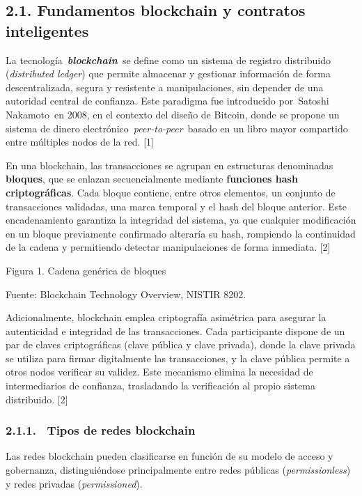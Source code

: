 \subsection{2.1. Fundamentos blockchain y contratos
inteligentes}\label{fundamentos-blockchain-y-contratos-inteligentes}

La tecnología~\textbf{\emph{blockchain}}~se define como un sistema de
registro distribuido (\emph{distributed ledger}) que permite almacenar y
gestionar información de forma descentralizada, segura y resistente a
manipulaciones, sin depender de una autoridad central de confianza. Este
paradigma fue introducido por~Satoshi Nakamoto~en 2008, en el contexto
del diseño de Bitcoin, donde se propone un sistema de dinero
electrónico~\emph{peer-to-peer}~basado en un libro mayor compartido
entre múltiples nodos de la red. {[}1{]}

En una blockchain, las transacciones se agrupan en estructuras
denominadas \textbf{bloques}, que se enlazan secuencialmente mediante
\textbf{funciones hash criptográficas}. Cada bloque contiene, entre
otros elementos, un conjunto de transacciones validadas, una marca
temporal y el hash del bloque anterior. Este encadenamiento garantiza la
integridad del sistema, ya que cualquier modificación en un bloque
previamente confirmado alteraría su hash, rompiendo la continuidad de la
cadena y permitiendo detectar manipulaciones de forma inmediata. {[}2{]}

Figura 1. Cadena genérica de bloques

Fuente: Blockchain Technology Overview, NISTIR 8202.

Adicionalmente, blockchain emplea criptografía asimétrica para asegurar
la autenticidad e integridad de las transacciones. Cada participante
dispone de un par de claves criptográficas (clave pública y clave
privada), donde la clave privada se utiliza para firmar digitalmente las
transacciones, y la clave pública permite a otros nodos verificar su
validez. Este mecanismo elimina la necesidad de intermediarios de
confianza, trasladando la verificación al propio sistema distribuido.
{[}2{]}

\subsubsection{2.1.1. ~Tipos de redes
blockchain}\label{tipos-de-redes-blockchain}

Las redes blockchain pueden clasificarse en función de su modelo de
acceso y gobernanza, distinguiéndose principalmente entre redes públicas
(\emph{permissionless}) y redes privadas (\emph{permissioned}).

